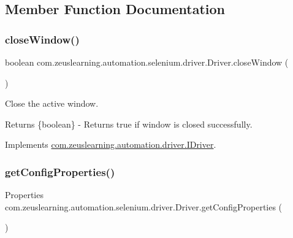 \subsection{Member Function Documentation}
\hypertarget{classcom_1_1zeuslearning_1_1automation_1_1selenium_1_1driver_1_1Driver_ac81edc32c4c0c5173723161f93b5d9a0}{}\label{classcom_1_1zeuslearning_1_1automation_1_1selenium_1_1driver_1_1Driver_ac81edc32c4c0c5173723161f93b5d9a0} 
\subsubsection{\texorpdfstring{close\+Window()}{closeWindow()}}
{\footnotesize\ttfamily boolean com.\+zeuslearning.\+automation.\+selenium.\+driver.\+Driver.\+close\+Window (\begin{DoxyParamCaption}{ }\end{DoxyParamCaption})\hspace{0.3cm}{\ttfamily [inline]}}

Close the active window.

\begin{DoxyReturn}{Returns}
\{boolean\} -\/ Returns {\ttfamily true} if window is closed successfully. 
\end{DoxyReturn}


Implements \hyperlink{interfacecom_1_1zeuslearning_1_1automation_1_1driver_1_1IDriver_a1efada042eeea9713b798f713bfad650}{com.\+zeuslearning.\+automation.\+driver.\+I\+Driver}.

\hypertarget{classcom_1_1zeuslearning_1_1automation_1_1selenium_1_1driver_1_1Driver_aa9b92da3b234318fa721d62da577debf}{}\label{classcom_1_1zeuslearning_1_1automation_1_1selenium_1_1driver_1_1Driver_aa9b92da3b234318fa721d62da577debf} 
\subsubsection{\texorpdfstring{get\+Config\+Properties()}{getConfigProperties()}}
{\footnotesize\ttfamily Properties com.\+zeuslearning.\+automation.\+selenium.\+driver.\+Driver.\+get\+Config\+Properties (\begin{DoxyParamCaption}{ }\end{DoxyParamCaption})\hspace{0.3cm}{\ttfamily [inline]}}

